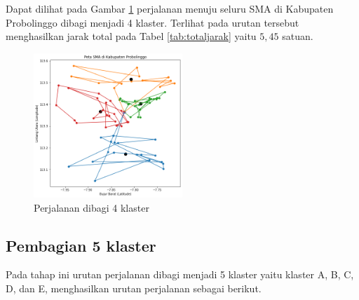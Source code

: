 Dapat dilihat pada Gambar \ref{fig:hasil_mtsp4} perjalanan menuju seluru SMA di Kabupaten Probolinggo dibagi menjadi 4 klaster. Terlihat pada urutan tersebut menghasilkan jarak total pada Tabel \ref{tab:totaljarak} yaitu $5,45$ satuan.

\begin{figure}[H]
\centering
\includegraphics[width=0.5\textwidth]{Gambar/hasil_mtsp/4}
\caption{Perjalanan dibagi 4 klaster}
\label{fig:hasil_mtsp4}
\end{figure}

\subsection{Pembagian 5 klaster}

Pada tahap ini urutan perjalanan dibagi menjadi 5 klaster yaitu klaster A, B, C, D, dan E, menghasilkan urutan perjalanan sebagai berikut.


